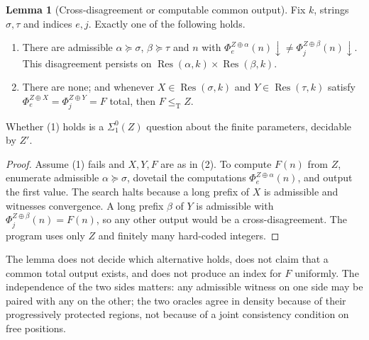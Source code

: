 \documentclass[11pt,letterpaper]{article}
\theoremstyle{definition}
\newtheorem{lemma}[definition]{Lemma}
\numberwithin{equation}{section}
\newcommand{\leT}{\le_{\mathrm T}}
\newcommand{\Res}{\operatorname{Res}}
\newcommand{\dn}{{\downarrow}}
\newcommand{\src}[1]{\leavevmode{\sffamily\footnotesize\color{Steel}[#1]}}
\begin{document}
\begin{lemma}[Cross-disagreement or computable common output]\label{lem:product}\src{R3, R4, R5}
Fix $k$, strings $\sigma,\tau$ and indices $e,j$. Exactly one of the following holds.
\begin{enumerate}[label=\textup{(\arabic*)}]
\item There are admissible $\alpha\succeq\sigma$, $\beta\succeq\tau$ and $n$ with $\Phi_e^{Z\oplus\alpha}(n)\dn\ne\Phi_j^{Z\oplus\beta}(n)\dn$. This disagreement persists on $\Res(\alpha,k)\times\Res(\beta,k)$.
\item There are none; and whenever $X\in\Res(\sigma,k)$ and $Y\in\Res(\tau,k)$ satisfy $\Phi_e^{Z\oplus X}=\Phi_j^{Z\oplus Y}=F$ total, then $F\leT Z$.
\end{enumerate}
Whether \textup{(1)} holds is a $\Sigma^0_1(Z)$ question about the finite parameters, decidable by $Z'$.
\end{lemma}
\begin{proof}
Assume (1) fails and $X,Y,F$ are as in (2). To compute $F(n)$ from $Z$, enumerate admissible $\alpha\succeq\sigma$, dovetail the computations $\Phi_e^{Z\oplus\alpha}(n)$, and output the first value. The search halts because a long prefix of $X$ is admissible and witnesses convergence. A long prefix $\beta$ of $Y$ is admissible with $\Phi_j^{Z\oplus\beta}(n)=F(n)$, so any other output would be a cross-disagreement. The program uses only $Z$ and finitely many hard-coded integers.
\end{proof}
The lemma does not decide which alternative holds, does not claim that a common total output exists, and does not produce an index for $F$ uniformly. The independence of the two sides matters: any admissible witness on one side may be paired with any on the other; the two oracles agree in density because of their progressively protected regions, not because of a joint consistency condition on free positions.
\end{document}

